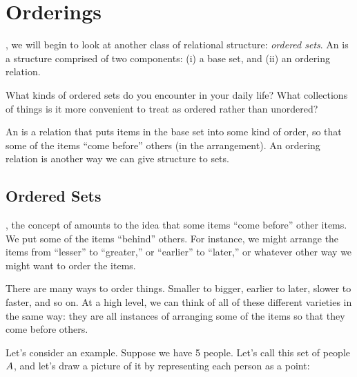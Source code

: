 \documentclass[../../../main.tex]{subfiles}
\begin{document}
\chapter{Orderings}
\label{ch:orderings}

, we will begin to look at another class of relational structure: \emph{ordered sets}. An  is a structure comprised of two components: (i) a base set, and (ii) an ordering relation.

\begin{ponder}
  What kinds of ordered sets do you encounter in your daily life? What collections of things is it more convenient to treat as ordered rather than unordered? 
\end{ponder}

An  is a relation that puts items in the base set into some kind of order, so that some of the items ``come before'' others (in the arrangement). An ordering relation is another way we can give structure to sets.


\section{Ordered Sets}

, the concept of  amounts to the idea that some items ``come before'' other items. We put some of the items ``behind'' others. For instance, we might arrange the items from ``lesser'' to ``greater,'' or ``earlier'' to ``later,'' or whatever other way we might want to order the items.

\begin{aside}
  \begin{remark}
    There are many ways to order things. Smaller to bigger, earlier to later, slower to faster, and so on. At a high level, we can think of all of these different varieties in the same way: they are all instances of arranging some of the items so that they come before others.
  \end{remark}
\end{aside}

Let's consider an example. Suppose we have 5 people. Let's call this set of people $A$, and let's draw a picture of it by representing each person as a point:
\end{document}
